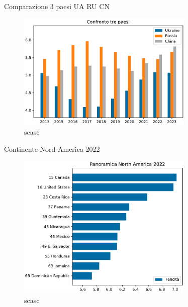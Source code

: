 \documentclass{beamer}
\begin{document}
\begin{frame}{Comparazione 3 paesi UA RU CN}
	\begin{figure}
		\centering
		\includegraphics[width=0.75\textwidth]{"./img/3ComparoPaesi_Ukraine_Russia_China.pdf"}
		\caption{scasc}
	\end{figure}
\end{frame}

\begin{frame}{Continente Nord America 2022}
	\begin{figure}
		\centering
		\includegraphics[width=0.75\textwidth]{"./img/4Classifica_North America_2022.pdf"}
		\caption{scasc}
	\end{figure}
\end{frame}
\end{document}
